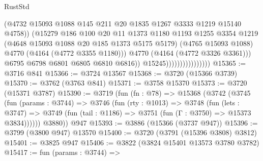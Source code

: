 \begin{lexlean}{RustStd}
\begin{coremodule}
                                            (@4732
                                              @15093
                                              @1088
                                              @145
                                              @211
                                              @20
                                              @1835
                                              @1267
                                              @3333
                                              @1219
                                              @15140
                                              @4758))
                                          (@15279
                                            @186
                                            @100
                                            @20
                                            @11
                                            @1373
                                            @1180
                                            @1193
                                            @1255
                                            @3354
                                            @1219
                                            (@4648 @15093 @1088 @20 @185 @1373 @5175 @5179)
                                            (@4765 @15093 @1088)
                                            @4770
                                            (@4164 (@4772 @3355 @1180)))
                                          @4770
                                          (@4164 (@4772 @3326 @3361)))
                                        @6795
                                        @6798
                                        @6801
                                        @6805
                                        @6810
                                        @6816))
                                    @15245))))))))))))))))
@15365 := @3716 @841
@15366 := @3724 @13567
@15368 := @3720 (@15366 @3739)
@15370 := @3762 (@3763 @841)
@15371 := @3758 @15370
@15373 := @3720 (@15371 @3787)
@15390 := @3719
    (fun (fn : @78) =>
    @15368
      (@3742
        (@3745
          (fun (params : @3744) =>
          @3746
            (fun (rty : @1013) =>
            @3748
              (fun (lets : @3747) =>
              @3749 (fun (tail : @1186) => @3751 (fun (Γ : @3750) => @15373 @3834))))))
        @3880))
    @947
@15393 := @3886 (@15366 (@3737 @947))
@15396 := @3799 (@3800 @947) @13570
@15400 := @3720 (@3791 (@15396 @3808) @3812)
@15401 := @3825 @947
@15406 := @3822 (@3824 @15401 @13573 @3780 @3782)
@15417 := fun (params : @3744) =>

\end{coremodule}
\end{lexlean}
